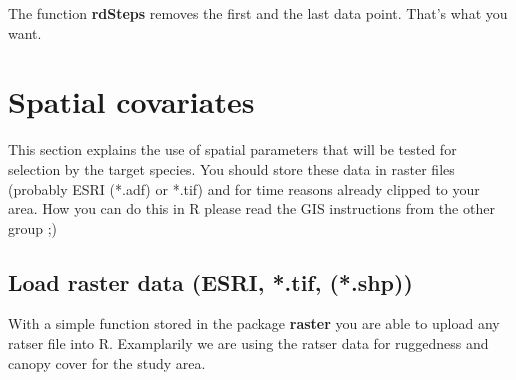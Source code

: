 \documentclass[11pt, a4paper]{article}\usepackage[]{graphicx}\usepackage[]{color}
\begin{document}
The function \textbf{rdSteps} removes the first and the last data point. That's what you want. 

\section{Spatial covariates}%
This section explains the use of spatial parameters that will be tested for selection by the target species. You should store these data in raster files (probably ESRI (*.adf) or *.tif) and for time reasons already clipped to your area. How you can do this in R please read the GIS instructions from the other group ;)   

\subsection{Load raster data (ESRI, *.tif, (*.shp))}%
With a simple function stored in the package \textbf{raster} you are able to upload any ratser file into R. Examplarily we are using the ratser data for ruggedness and canopy cover for the study area.  
\end{document}
